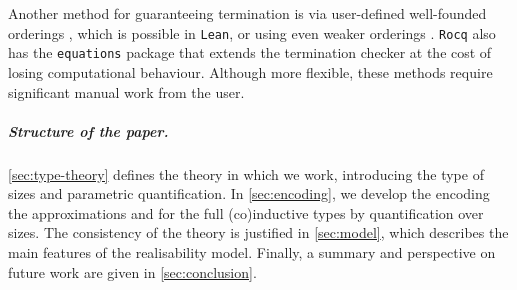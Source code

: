 Another method for guaranteeing termination is via user-defined well-founded orderings \cite{Leroy2024}, which is possible in \texttt{Lean}, or using even weaker orderings \cite{qwf-order}.
\texttt{Rocq} also has the \texttt{equations} package \cite{hutchison_equations_2010,mangin2015equations,sozeau2019equations} that extends the termination checker at the cost of losing computational behaviour.
Although more flexible, these methods require significant manual work from the user.

\subparagraph*{Structure of the paper.}
\autoref{sec:type-theory} defines the theory in which we work, introducing the type of sizes and parametric quantification. In \autoref{sec:encoding}, we develop the encoding the approximations and for the full (co)inductive types by quantification over sizes. The consistency of the theory is justified in \autoref{sec:model}, which describes the main features of the realisability model. Finally, a summary and perspective on future work are given in \autoref{sec:conclusion}.